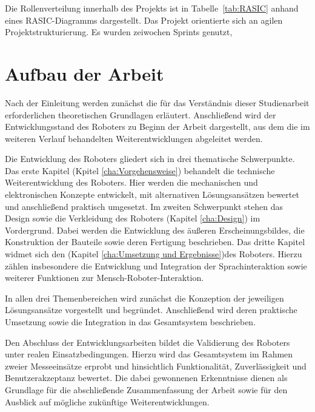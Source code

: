 Die Rollenverteilung innerhalb des Projekts ist in Tabelle~\ref{tab:RASIC} anhand eines RASIC-Diagramms dargestellt. Das Projekt orientierte sich an agilen Projektstrukturierung. Es wurden zeiwochen Sprints genutzt, 

\begin{table}[htbp]
	\centering
	
	\caption{RASIC zur Rollenverteilung}
	\label{tab:RASIC}
\end{table}

\section{Aufbau der Arbeit}

Nach der Einleitung werden zunächst die für das Verständnis dieser Studienarbeit erforderlichen theoretischen Grundlagen erläutert. Anschließend wird der Entwicklungsstand des Roboters zu Beginn der Arbeit dargestellt, aus dem die im weiteren Verlauf behandelten Weiterentwicklungen abgeleitet werden.

Die Entwicklung des Roboters gliedert sich in drei thematische Schwerpunkte. Das erste Kapitel (Kpitel \ref{cha:Vorgehensweise}) behandelt die technische Weiterentwicklung des Roboters. Hier werden die mechanischen und elektronischen Konzepte entwickelt, mit alternativen Lösungsansätzen bewertet und anschließend praktisch umgesetzt. Im zweiten Schwerpunkt stehen das Design sowie die Verkleidung des Roboters (Kapitel \ref{cha:Design}) im Vordergrund. Dabei werden die Entwicklung des äußeren Erscheinungsbildes, die Konstruktion der Bauteile sowie deren Fertigung beschrieben. Das dritte Kapitel widmet sich den  (Kapitel 
\ref{cha:Umsetzung und Ergebnisse})des Roboters. Hierzu zählen insbesondere die Entwicklung und Integration der Sprachinteraktion sowie weiterer Funktionen zur Mensch-Roboter-Interaktion.

In allen drei Themenbereichen wird zunächst die Konzeption der jeweiligen Lösungsansätze vorgestellt und begründet. Anschließend wird deren praktische Umsetzung sowie die Integration in das Gesamtsystem beschrieben.

Den Abschluss der Entwicklungsarbeiten bildet die Validierung des Roboters unter realen Einsatzbedingungen. Hierzu wird das Gesamtsystem im Rahmen zweier Messeeinsätze erprobt und hinsichtlich Funktionalität, Zuverlässigkeit und Benutzerakzeptanz bewertet. Die dabei gewonnenen Erkenntnisse dienen als Grundlage für die abschließende Zusammenfassung der Arbeit sowie für den Ausblick auf mögliche zukünftige Weiterentwicklungen.
